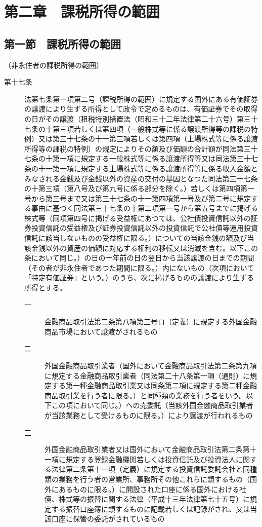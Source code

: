 \documentclass[twocolumn,a4j,10pt]{ltjtarticle}
\begin{document}
\section*{第二章　課税所得の範囲}
\subsection*{第一節　課税所得の範囲}
\noindent\hspace{10pt}（非永住者の課税所得の範囲）
\begin{description}
\item[第十七条]法第七条第一項第二号（課税所得の範囲）に規定する国外にある有価証券の譲渡により生ずる所得として政令で定めるものは、有価証券でその取得の日がその譲渡（租税特別措置法（昭和三十二年法律第二十六号）第三十七条の十第三項若しくは第四項（一般株式等に係る譲渡所得等の課税の特例）又は第三十七条の十一第三項若しくは第四項（上場株式等に係る譲渡所得等の課税の特例）の規定によりその額及び価額の合計額が同法第三十七条の十第一項に規定する一般株式等に係る譲渡所得等又は同法第三十七条の十一第一項に規定する上場株式等に係る譲渡所得等に係る収入金額とみなされる金銭及び金銭以外の資産の交付の基因となつた同法第三十七条の十第三項（第八号及び第九号に係る部分を除く。）若しくは第四項第一号から第三号まで又は第三十七条の十一第四項第一号及び第二号に規定する事由に基づく同法第三十七条の十第二項第一号から第五号までに掲げる株式等（同項第四号に掲げる受益権にあつては、公社債投資信託以外の証券投資信託の受益権及び証券投資信託以外の投資信託で公社債等運用投資信託に該当しないものの受益権に限る。）についての当該金銭の額及び当該金銭以外の資産の価額に対応する権利の移転又は消滅を含む。以下この条において同じ。）の日の十年前の日の翌日から当該譲渡の日までの期間（その者が非永住者であつた期間に限る。）内にないもの（次項において「特定有価証券」という。）のうち、次に掲げるものの譲渡により生ずる所得とする。
\begin{description}
\item[一]金融商品取引法第二条第八項第三号ロ（定義）に規定する外国金融商品市場において譲渡がされるもの
\item[二]外国金融商品取引業者（国外において金融商品取引法第二条第九項に規定する金融商品取引業者（同法第二十八条第一項（通則）に規定する第一種金融商品取引業又は同条第二項に規定する第二種金融商品取引業を行う者に限る。）と同種類の業務を行う者をいう。以下この項において同じ。）への売委託（当該外国金融商品取引業者が当該業務として受けるものに限る。）により譲渡が行われるもの
\item[三]外国金融商品取引業者又は国外において金融商品取引法第二条第十一項に規定する登録金融機関若しくは投資信託及び投資法人に関する法律第二条第十一項（定義）に規定する投資信託委託会社と同種類の業務を行う者の営業所、事務所その他これらに類するもの（国外にあるものに限る。）に開設された口座に係る国外における社債、株式等の振替に関する法律（平成十三年法律第七十五号）に規定する振替口座簿に類するものに記載若しくは記録がされ、又は当該口座に保管の委託がされているもの

\end{description}
\end{description}
\end{document}
